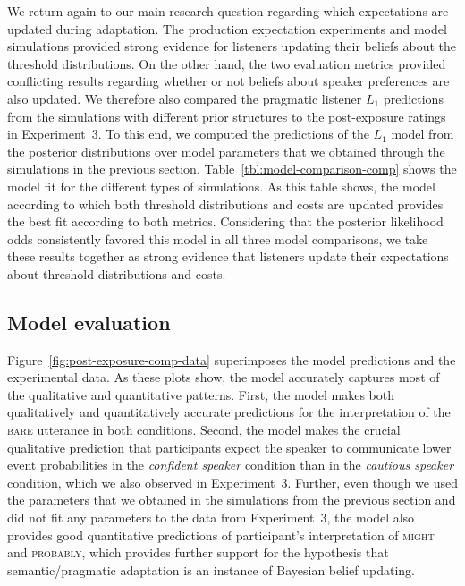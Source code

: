 \documentclass[man, floatsintext]{apa6}
\newcommand{\tableref}[1]{Table~\ref{#1}}
\newcommand{\figref}[1]{Figure~\ref{#1}}
\begin{document}
We return again to our main research question regarding which expectations are updated during adaptation. The production expectation experiments and model simulations provided strong evidence for listeners updating 
their beliefs about the threshold distributions. On the other hand, the two evaluation metrics provided conflicting results regarding whether or not beliefs about speaker preferences are also updated.
We therefore also compared the pragmatic listener $L_1$ predictions from the simulations with different prior structures to the post-exposure ratings in Experiment~3. To this end, we computed the predictions of the $L_1$ model from the
posterior distributions over model parameters that we obtained through the simulations in the previous section. \tableref{tbl:model-comparison-comp} shows the model fit
for the different types of simulations. As this table shows, the model according to which both threshold distributions and costs are updated provides the best fit according to both metrics. 
Considering that the posterior likelihood odds consistently favored this model in all three model comparisons, we take these results together as strong evidence that listeners update their expectations about threshold distributions
and costs. 

\subsection{Model evaluation}


\figref{fig:post-exposure-comp-data} superimposes the model predictions and the experimental data. As these plots show, the model accurately captures most of the qualitative and quantitative patterns. First, 
the model makes both qualitatively and quantitatively accurate predictions for the interpretation of the \textsc{bare} utterance in both conditions. Second, the model makes the crucial qualitative prediction that participants expect the speaker to communicate lower event probabilities in the \textit{confident speaker} condition than in the \textit{cautious speaker} condition, which we also observed in Experiment~3. Further, even though we used the parameters that we obtained in the simulations from the previous section and did not fit any parameters to the data from Experiment~3, the model also provides good quantitative predictions of participant's interpretation of \textsc{might} and \textsc{probably},
which provides further support for the hypothesis that semantic/pragmatic adaptation is an instance of Bayesian belief updating.
\end{document}
